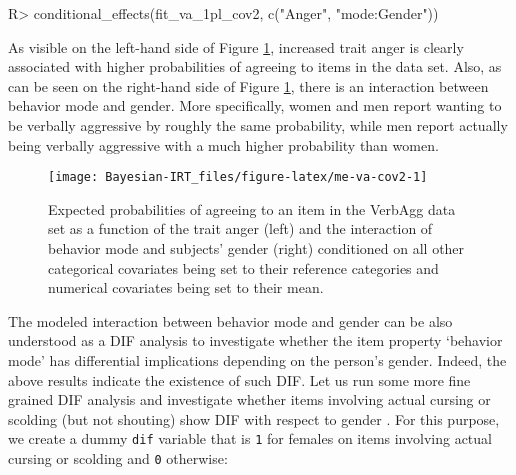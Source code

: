 \documentclass[
]{jss}
\begin{document}
\begin{CodeChunk}

\begin{CodeInput}
R> conditional_effects(fit_va_1pl_cov2, c("Anger", "mode:Gender"))
\end{CodeInput}
\end{CodeChunk}

As visible on the left-hand side of Figure \ref{fig:me-va-cov2},
increased trait anger is clearly associated with higher probabilities of
agreeing to items in the  data set. Also, as can be seen
on the right-hand side of Figure \ref{fig:me-va-cov2}, there is an
interaction between behavior mode and gender. More specifically, women
and men report wanting to be verbally aggressive by roughly the same
probability, while men report actually being verbally aggressive with a
much higher probability than women.

\begin{CodeChunk}
\begin{figure}

{\centering \texttt{[image: Bayesian-IRT\_files/figure-latex/me-va-cov2-1]} 

}

\caption[Expected probabilities of agreeing to an item in the VerbAgg data set as a function of the trait anger (left) and the interaction of behavior mode and subjects' gender (right) conditioned on all other categorical covariates being set to their reference categories and numerical covariates being set to their mean]{Expected probabilities of agreeing to an item in the VerbAgg data set as a function of the trait anger (left) and the interaction of behavior mode and subjects' gender (right) conditioned on all other categorical covariates being set to their reference categories and numerical covariates being set to their mean.}\label{fig:me-va-cov2}
\end{figure}
\end{CodeChunk}

The modeled interaction between behavior mode and gender can be also
understood as a DIF analysis to investigate whether the item property
`behavior mode' has differential implications depending on the person's
gender. Indeed, the above results indicate the existence of such DIF.
Let us run some more fine grained DIF analysis and investigate whether
items involving actual cursing or scolding (but not shouting) show DIF
with respect to gender \citep[inspired by][]{deboeck2011}. For this
purpose, we create a dummy \texttt{dif} variable that is \texttt{1} for
females on items involving actual cursing or scolding and \texttt{0}
otherwise:
\end{document}
